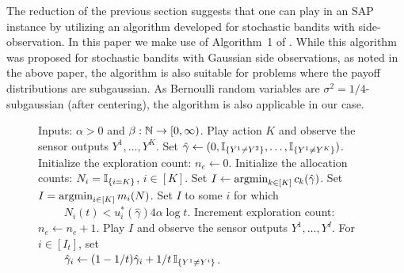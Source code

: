 \newcommand{\set}{\leftarrow}
\newcommand{\hgamma}{\hat{\gamma}}
The reduction of the previous section suggests that one can play in an SAP instance by utilizing 
an algorithm developed for stochastic bandits with side-observation.
In this paper we make use of Algorithm~1 of \citet{WGySz:NIPS15}. 
While this algorithm was proposed for stochastic bandits with Gaussian side observations, 
as noted in the above paper, the algorithm is also suitable for problems where the payoff distributions are subgaussian.
As Bernoulli random variables are $\sigma^2=1/4$-subgaussian (after centering),
the algorithm is also applicable in our case.

\begin{wrapfigure}{L}{0.55\textwidth}
\vspace{-0.4cm}
\begin{minipage}{0.54\textwidth}
\begin{algorithm}[H]
\caption{} %
\label{alg:asym}
\begin{algorithmic}[1]
\STATE Inputs: $\alpha>0$ and $\beta: \mathbb{N} \to [0,\infty)$.
\STATE Play action $K$ and observe the sensor outputs $Y^1,\dots,Y^K$.
\STATE Set $\hgamma \set (0,\one{Y^1\ne Y^2},\dots,\one{Y^1\ne Y^K})$.
\STATE Initialize the exploration count: $n_e \set 0$.
\STATE Initialize the allocation counts: $N_i = \mathbb{I}_{\{i=K\}}$, $i\in [K]$.
	\IF{$\frac{N}{4\alpha \log t}\in C(\hgamma)$} \label{alg:check}
		\STATE Set $I \set \argmin_{k\in [K]} c_k(\hgamma)$. \label{alg:greedy}
	\ELSE
		 \label{alg:starve}
			\STATE Set $I = \operatorname{argmin}_{i\in [K]}m_i(N)$. \label{alg:forced}
		\ELSE
			\STATE Set $I$ to some $i$ for which \label{alg:plan} \\
			$\qquad$ $N_i(t)< u_i^*(\hgamma)4\alpha\log t$.
		\ENDIF
		\STATE Increment exploration count: $n_e \set n_e+1$.
	\ENDIF
	\STATE Play $I$ and observe the sensor outputs $Y^1,\dots,Y^{I}$.
	\STATE For $i\in [I_t]$, set\\
	$\qquad$ $\hgamma_i \set (1-1/t) \hgamma_i + 1/t \,\one{Y^1\ne Y^i}$.
\ENDFOR
\end{algorithmic}
\end{algorithm}
\end{minipage}
\vspace{-0.3cm}
\end{wrapfigure}

